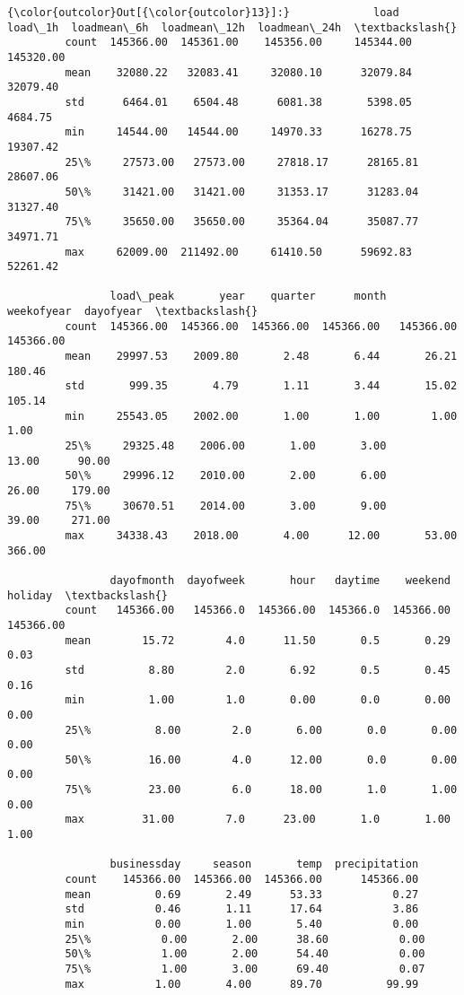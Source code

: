 \documentclass[11pt]{article}
\begin{document}
\begin{Verbatim}[commandchars=\\\{\}]
{\color{outcolor}Out[{\color{outcolor}13}]:}             load    load\_1h  loadmean\_6h  loadmean\_12h  loadmean\_24h  \textbackslash{}
         count  145366.00  145361.00    145356.00     145344.00     145320.00   
         mean    32080.22   32083.41     32080.10      32079.84      32079.40   
         std      6464.01    6504.48      6081.38       5398.05       4684.75   
         min     14544.00   14544.00     14970.33      16278.75      19307.42   
         25\%     27573.00   27573.00     27818.17      28165.81      28607.06   
         50\%     31421.00   31421.00     31353.17      31283.04      31327.40   
         75\%     35650.00   35650.00     35364.04      35087.77      34971.71   
         max     62009.00  211492.00     61410.50      59692.83      52261.42   
         
                load\_peak       year    quarter      month  weekofyear  dayofyear  \textbackslash{}
         count  145366.00  145366.00  145366.00  145366.00   145366.00  145366.00   
         mean    29997.53    2009.80       2.48       6.44       26.21     180.46   
         std       999.35       4.79       1.11       3.44       15.02     105.14   
         min     25543.05    2002.00       1.00       1.00        1.00       1.00   
         25\%     29325.48    2006.00       1.00       3.00       13.00      90.00   
         50\%     29996.12    2010.00       2.00       6.00       26.00     179.00   
         75\%     30670.51    2014.00       3.00       9.00       39.00     271.00   
         max     34338.43    2018.00       4.00      12.00       53.00     366.00   
         
                dayofmonth  dayofweek       hour   daytime    weekend    holiday  \textbackslash{}
         count   145366.00   145366.0  145366.00  145366.0  145366.00  145366.00   
         mean        15.72        4.0      11.50       0.5       0.29       0.03   
         std          8.80        2.0       6.92       0.5       0.45       0.16   
         min          1.00        1.0       0.00       0.0       0.00       0.00   
         25\%          8.00        2.0       6.00       0.0       0.00       0.00   
         50\%         16.00        4.0      12.00       0.0       0.00       0.00   
         75\%         23.00        6.0      18.00       1.0       1.00       0.00   
         max         31.00        7.0      23.00       1.0       1.00       1.00   
         
                businessday     season       temp  precipitation  
         count    145366.00  145366.00  145366.00      145366.00  
         mean          0.69       2.49      53.33           0.27  
         std           0.46       1.11      17.64           3.86  
         min           0.00       1.00       5.40           0.00  
         25\%           0.00       2.00      38.60           0.00  
         50\%           1.00       2.00      54.40           0.00  
         75\%           1.00       3.00      69.40           0.07  
         max           1.00       4.00      89.70          99.99  
\end{Verbatim}
            
\end{document}
